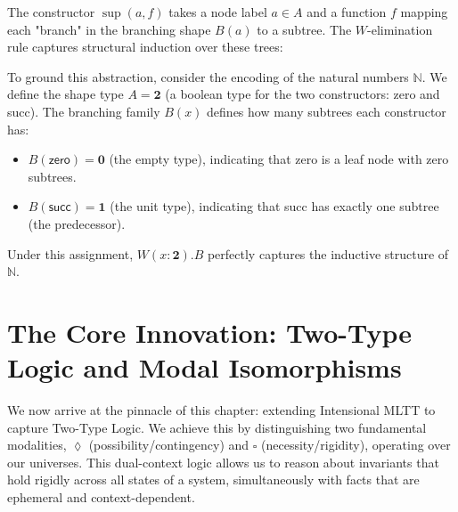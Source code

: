 \begin{definition}
\begin{mathpar}

\end{mathpar}

The constructor $\sup(a, f)$ takes a node label $a \in A$ and a function $f$ mapping each "branch" in the branching shape $B(a)$ to a subtree. The $W$-elimination rule captures structural induction over these trees:
\begin{mathpar}
\end{mathpar}
\end{definition}

To ground this abstraction, consider the encoding of the natural numbers $\mathbb{N}$. We define the shape type $A = \mathbf{2}$ (a boolean type for the two constructors: \textsf{zero} and \textsf{succ}). The branching family $B(x)$ defines how many subtrees each constructor has:
\begin{itemize}
    \item $B(\textsf{zero}) = \mathbf{0}$ (the empty type), indicating that \textsf{zero} is a leaf node with zero subtrees.
    \item $B(\textsf{succ}) = \mathbf{1}$ (the unit type), indicating that \textsf{succ} has exactly one subtree (the predecessor).
\end{itemize}
Under this assignment, $W(x:\mathbf{2}).B$ perfectly captures the inductive structure of $\mathbb{N}$.

\section{The Core Innovation: Two-Type Logic and Modal Isomorphisms}

We now arrive at the pinnacle of this chapter: extending Intensional MLTT to capture Two-Type Logic. We achieve this by distinguishing two fundamental modalities, $\lozenge$ (possibility/contingency) and $\square$ (necessity/rigidity), operating over our universes. This dual-context logic allows us to reason about invariants that hold rigidly across all states of a system, simultaneously with facts that are ephemeral and context-dependent.

